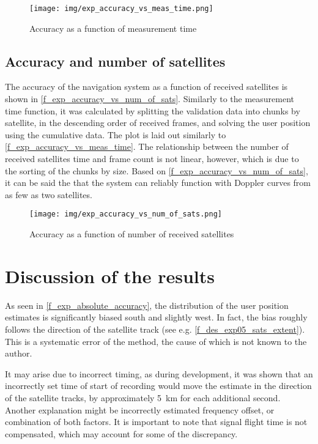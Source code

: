 \begin{figure}
    \centering
    \texttt{[image: img/exp\_accuracy\_vs\_meas\_time.png]}
    \caption{Accuracy as a function of measurement time}
    \label{f_exp_accuracy_vs_meas_time}
\end{figure}


\subsection{Accuracy and number of satellites}
The accuracy of the navigation system as a function of received satellites is shown in \autoref{f_exp_accuracy_vs_num_of_sats}. Similarly to the measurement time function, it was calculated by splitting the validation data into chunks by satellite, in the descending order of received frames, and solving the user position using the cumulative data. The plot is laid out similarly to  \autoref{f_exp_accuracy_vs_meas_time}. The relationship between the number of received satellites time and frame count is not linear, however, which is due to the sorting of the chunks by size. Based on \autoref{f_exp_accuracy_vs_num_of_sats}, it can be said the that the system can reliably function with Doppler curves from as few as two satellites.


\begin{figure}
    \centering
    \texttt{[image: img/exp\_accuracy\_vs\_num\_of\_sats.png]}
    \caption{Accuracy as a function of number of received satellites}
    \label{f_exp_accuracy_vs_num_of_sats}
\end{figure}


\section{Discussion of the results}
As seen in \autoref{f_exp_absolute_accuracy}, the distribution of the user position estimates is significantly biased south and slightly west. In fact, the bias roughly follows the direction of the satellite track (see e.g. \autoref{f_des_exp05_sats_extent}). This is a systematic error of the method, the cause of which is not known to the author. 

It may arise due to incorrect timing, as during development, it was shown that an incorrectly set time of start of recording would move the estimate in the direction of the satellite tracks, by approximately \qty{+5}{km} for each additional second. Another explanation might be incorrectly estimated frequency offset, or combination of both factors. It is important to note that signal flight time is not compensated, which may account for some of the discrepancy.

